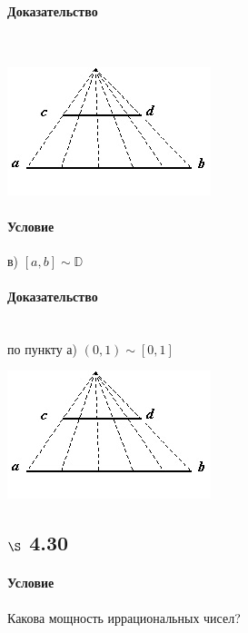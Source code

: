 \documentclass[a4paper,12pt]{article}
\begin{document}
\paragraph*{Доказательство}\mbox{}\\
\begin{center}
  \includegraphics[scale=0.7]{image007.jpg}
\end{center}

\paragraph*{Условие}
в) $\left[ a, b \right] \sim \mathbb{D}$
\paragraph*{Доказательство}\mbox{}\\
по пункту а) $\left( 0, 1\right)  \sim \left[  0, 1 \right]$\\ 
\begin{center}
  \includegraphics[scale=0.7]{image007.jpg}
\end{center}

\subsection*{$\S$ 4.30}
\paragraph*{Условие}
Какова мощность иррациональных чисел?
\end{document}
